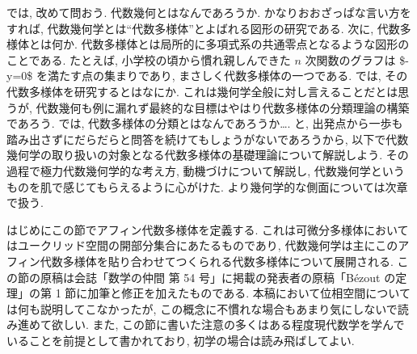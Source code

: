 \documentclass[openany, a4paper, oneside]{jsbook}
\theoremstyle{break}
\theoremstyle{breakdefn}
\begin{document}
では, 改めて問おう.
代数幾何とはなんであろうか.
かなりおおざっぱな言い方をすれば, 代数幾何学とは``代数多様体''とよばれる図形の研究である.
次に, 代数多様体とは何か.
代数多様体とは局所的に多項式系の共通零点となるような図形のことである.
たとえば, 小学校の頃から慣れ親しんできた $n$ 次関数のグラフは \$-y=0\$ を満たす点の集まりであり,
まさしく代数多様体の一つである.
では, その代数多様体を研究するとはなにか.
これは幾何学全般に対し言えることだとは思うが, 代数幾何も例に漏れず最終的な目標はやはり代数多様体の分類理論の構築であろう.
では, 代数多様体の分類とはなんであろうか\dots{}.
と, 出発点から一歩も踏み出さずにだらだらと問答を続けてもしょうがないであろうから,
以下で代数幾何学の取り扱いの対象となる代数多様体の基礎理論について解説しよう.
その過程で極力代数幾何学的な考え方, 動機づけについて解説し, 代数幾何学というものを肌で感じてもらえるように心がけた.
より幾何学的な側面については次章で扱う.

はじめにこの節でアフィン代数多様体を定義する.
これは可微分多様体においてはユークリッド空間の開部分集合にあたるものであり,
代数幾何学は主にこのアフィン代数多様体を貼り合わせてつくられる代数多様体について展開される.
この節の原稿は会誌「数学の仲間 第 54 号」に掲載の発表者の原稿「B\'ezout の定理」の第 1 節に加筆と修正を加えたものである.
本稿において位相空間については何も説明してこなかったが,
この概念に不慣れな場合もあまり気にしないで読み進めて欲しい.
また, この節に書いた注意の多くはある程度現代数学を学んでいることを前提として書かれており, 初学の場合は読み飛ばしてよい.
\end{document}
